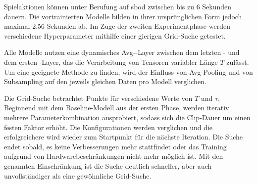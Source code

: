 Spielaktionen können unter Berufung auf \gls{sbod} zwischen bis zu 6 Sekunden dauern.
Die vortrainierten Modelle bilden in ihrer ursprünglichen Form jedoch maximal 2.56 Sekunden ab.
Im Zuge der zweiten Experimentphase werden verschiedene Hyperparameter mithilfe einer gierigen Grid-Suche getestet.

Alle Modelle nutzen eine dynamisches Avg-\pool-Layer zwischen dem letzten \conv- und dem ersten \fc-Layer, das die Verarbeitung von Tensoren variabler Länge $T$ zulässt.
Um eine geeignete Methode zu finden, wird der Einfluss von Avg-Pooling und von Subsampling auf den jeweils gleichen Daten pro Modell verglichen.

Die Grid-Suche betrachtet Punkte für verschiedene Werte von $T$ und $\tau$.
Beginnend mit dem Baseline-Modell aus der ersten Phase, werden iterativ mehrere Parameterkombination ausprobiert, sodass sich die Clip-Dauer um einen festen Faktor erhöht.
Die Konfigurationen werden verglichen und die erfolgreichere wird wieder zum Startpunkt für die nächste Iteration.
Die Suche endet sobald, es keine Verbesserungen mehr stattfindet oder das Training aufgrund von Hardwarebeschränkungen nicht mehr möglich ist.
Mit den genannten Einschränkung ist die Suche deutlich schneller, aber auch unvollständiger als eine gewöhnliche Grid-Suche.

